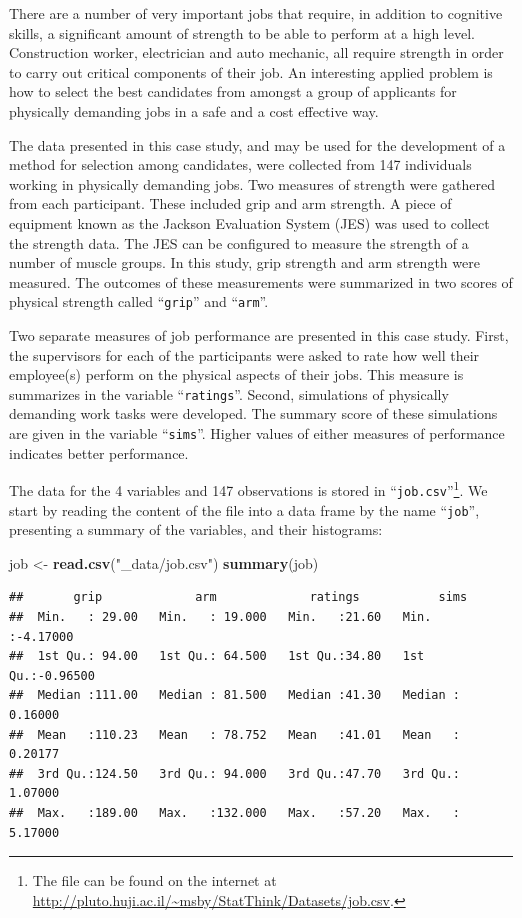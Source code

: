\documentclass[]{krantz}
\makeatletter
\newenvironment{Shaded}{\begin{snugshade}}{\end{snugshade}}
\newcommand{\KeywordTok}[1]{\textcolor[rgb]{0.13,0.29,0.53}{\textbf{#1}}}
\newcommand{\StringTok}[1]{\textcolor[rgb]{0.31,0.60,0.02}{#1}}
\newcommand{\NormalTok}[1]{#1}
\newenvironment{kframe}{%
\medskip{}
\setlength{\fboxsep}{.8em}
 \def\at@end@of@kframe{}%
 \ifinner\ifhmode%
  \def\at@end@of@kframe{\end{minipage}}%
  \begin{minipage}{\columnwidth}%
 \fi\fi%
 \def\FrameCommand##1{\hskip\@totalleftmargin \hskip-\fboxsep
 \colorbox{shadecolor}{##1}\hskip-\fboxsep
     \hskip-\linewidth \hskip-\@totalleftmargin \hskip\columnwidth}%
 \MakeFramed {\advance\hsize-\width
   \@totalleftmargin\z@ \linewidth\hsize
   \@setminipage}}%
 {\par\unskip\endMakeFramed%
 \at@end@of@kframe}
\renewenvironment{Shaded}{\begin{kframe}}{\end{kframe}}
\theoremstyle{definition}
\theoremstyle{definition}
\theoremstyle{definition}
\theoremstyle{remark}
\makeatother
\begin{document}
There are a number of very important jobs that require, in addition to
cognitive skills, a significant amount of strength to be able to perform
at a high level. Construction worker, electrician and auto mechanic, all
require strength in order to carry out critical components of their job.
An interesting applied problem is how to select the best candidates from
amongst a group of applicants for physically demanding jobs in a safe
and a cost effective way.

The data presented in this case study, and may be used for the
development of a method for selection among candidates, were collected
from 147 individuals working in physically demanding jobs. Two measures
of strength were gathered from each participant. These included grip and
arm strength. A piece of equipment known as the Jackson Evaluation
System (JES) was used to collect the strength data. The JES can be
configured to measure the strength of a number of muscle groups. In this
study, grip strength and arm strength were measured. The outcomes of
these measurements were summarized in two scores of physical strength
called ``\texttt{grip}'' and ``\texttt{arm}''.

Two separate measures of job performance are presented in this case
study. First, the supervisors for each of the participants were asked to
rate how well their employee(s) perform on the physical aspects of their
jobs. This measure is summarizes in the variable ``\texttt{ratings}''.
Second, simulations of physically demanding work tasks were developed.
The summary score of these simulations are given in the variable
``\texttt{sims}''. Higher values of either measures of performance
indicates better performance.

The data for the 4 variables and 147 observations is stored in
``\texttt{job.csv}''\footnote{The file can be found on the internet at
  \url{http://pluto.huji.ac.il/~msby/StatThink/Datasets/job.csv}.}. We
start by reading the content of the file into a data frame by the name
``\texttt{job}'', presenting a summary of the variables, and their
histograms:

\begin{Shaded}
\begin{Highlighting}[]
\NormalTok{job <-}\StringTok{ }\KeywordTok{read.csv}\NormalTok{(}\StringTok{"_data/job.csv"}\NormalTok{)}
\KeywordTok{summary}\NormalTok{(job)}
\end{Highlighting}
\end{Shaded}

\begin{verbatim}
##       grip             arm             ratings           sims         
##  Min.   : 29.00   Min.   : 19.000   Min.   :21.60   Min.   :-4.17000  
##  1st Qu.: 94.00   1st Qu.: 64.500   1st Qu.:34.80   1st Qu.:-0.96500  
##  Median :111.00   Median : 81.500   Median :41.30   Median : 0.16000  
##  Mean   :110.23   Mean   : 78.752   Mean   :41.01   Mean   : 0.20177  
##  3rd Qu.:124.50   3rd Qu.: 94.000   3rd Qu.:47.70   3rd Qu.: 1.07000  
##  Max.   :189.00   Max.   :132.000   Max.   :57.20   Max.   : 5.17000
\end{verbatim}
\end{document}
